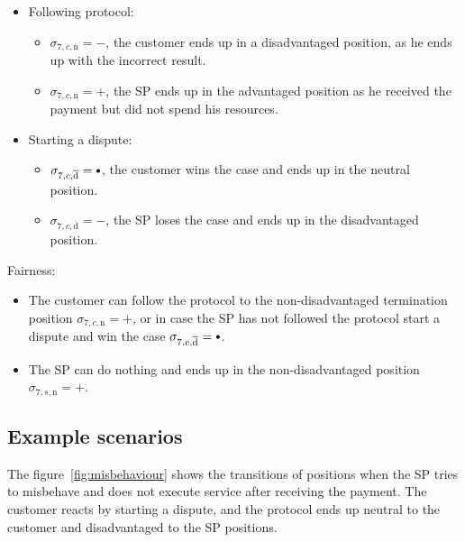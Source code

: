 \documentclass{ieeeaccess}
\newcommand\sbullet[1][.75]{\mathbin{\ThisStyle{\vcenter{\hbox{%
  \scalebox{#1}{$\SavedStyle\bullet$}}}}}%
}
\begin{document}
\begin{itemize}
\item
  Following protocol:

  \begin{itemize}
  
  \item
    \(\sigma_{7, c, \overline{\mathrm{n}}} = -\), the customer ends up in a disadvantaged position, as he ends up with the incorrect result.
  \item
    \(\sigma_{7, c, \overline{\mathrm{n}}} = +\), the SP ends up in the advantaged position as he received the payment but did not spend his resources.
  \end{itemize}
\item
  Starting a dispute:

  \begin{itemize}
  
  \item
    \(\sigma_{7, c, \overline{\mathrm{d}}} = \sbullet\), the customer wins the case and ends up in the neutral position.
  \item
    \(\sigma_{7, c, \overline{\mathrm{d}}} = -\), the SP loses the case and ends up in the disadvantaged position.
  \end{itemize}
\end{itemize}

Fairness:

\begin{itemize}

\item
  The customer can follow the protocol to the non-disadvantaged termination position \(\sigma_{7, c, \mathrm{n}} = +\), or in case the SP has not followed the protocol start a dispute and win the case \(\sigma_{7, c, \overline{\mathrm{d}}} = \sbullet\).
\item
  The SP can do nothing and ends up in the non-disadvantaged position \(\sigma_{7, s, \mathrm{n}} = +\).
\end{itemize}

\subsection{Example scenarios}\label{example-scenarios}

The figure~\ref{fig:misbehaviour} shows the transitions of positions when the SP tries to misbehave and does not execute service after receiving the payment. The customer reacts by starting a dispute, and the protocol ends up neutral to the customer and disadvantaged to the SP positions.
\end{document}
